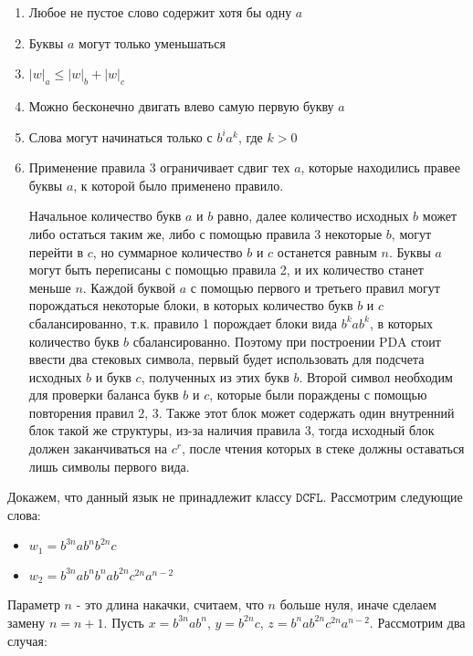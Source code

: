 \documentclass[a4paper, 14pt]{article}
\begin{document}
\begin{enumerate}
  \item Любое не пустое слово содержит хотя бы одну $a$
  \item Буквы $a$ могут только уменьшаться
  \item $|w|_a \leq |w|_b + |w|_c$
  \item Можно бесконечно двигать влево самую первую букву $a$
  \item Слова могут начинаться только с $b^i a^k$, где $k > 0$
  \item Применение правила 3 ограничивает сдвиг тех $a$, которые находились правее буквы $a$, к которой было применено правило.

    
Начальное количество букв $a$ и $b$ равно, далее количество исходных $b$ может либо остаться таким же, либо с помощью правила 3 некоторые $b$, могут перейти в $c$, но суммарное количество $b$ и $c$ останется равным $n$. Буквы $a$ могут быть переписаны с помощью правила 2, и их количество станет меньше $n$. Каждой буквой $a$ с помощью первого и третьего правил могут порождаться некоторые блоки, в которых количество букв $b$ и $c$ сбалансированно, т.к. правило 1 порождает блоки вида $b^k a b^k$, в которых количество букв $b$ сбалансированно. Поэтому при построении PDA стоит ввести два стековых символа, первый будет использовать для подсчета исходных $b$ и букв $c$, полученных из этих букв $b$. Второй символ необходим для проверки баланса букв $b$ и $c$, которые были пораждены с помощью повторения правил 2, 3. Также этот блок может содержать один внутренний блок такой же структуры, из-за наличия правила 3, тогда исходный блок должен заканчиваться на $c^r$, после чтения которых в стеке должны оставаться лишь символы первого вида.


\end{enumerate}


Докажем, что данный язык не принадлежит классу $\mathtt{DCFL}$. Рассмотрим следующие слова:

\begin{itemize}
  \item $w_1 = b^{3n} a b^n b^{2n} c$
  \item $w_2 = b^{3n} a b^{n} b^{n} a b^{2n} c^{2n} a^{n-2}$
\end{itemize}

Параметр $n$ - это длина накачки, считаем, что $n$ больше нуля, иначе сделаем замену $n = n + 1$. Пусть $x = b^{3n} a b^n$, $y = b^{2n} c$, $z = b^{n} a b^{2n} c^{2n} a^{n-2}$. Рассмотрим два случая:
\end{document}
